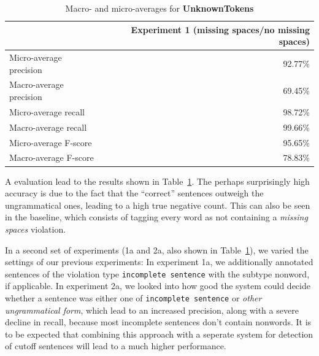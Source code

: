\documentclass[a4paper,10pt]{scrartcl}
\begin{document}
\begin{table}

\begin{center}
\begin{tabular}{l|r}
& Experiment 1 (missing spaces/no missing spaces) \\
\hline
Micro-average precision & 92.77\% \\
\hline
Macro-average precision & 69.45\% \\
\hline
Micro-average recall & 98.72\% \\
\hline
Macro-average recall & 99.66\% \\
\hline
Micro-average F-score & 95.65\% \\
\hline
Macro-average F-score & 78.83\% \\
\end{tabular}
\end{center}
\caption{Macro- and micro-averages for \textbf{UnknownTokens}} %








\label{eval3}
\end{table}


A evaluation lead to the results shown in Table~\ref{eval3}. The perhaps surprisingly high accuracy is due to the fact that the ``correct'' sentences outweigh the ungrammatical ones, leading to a high true negative count. This can also be seen in the baseline, which consists of tagging every word as not containing a \textit{missing spaces} violation.

In a second set of experiments (1a and 2a, also shown in Table~\ref{eval3}), we varied the settings of our previous experiments: In experiment 1a, we additionally annotated sentences of the violation type \texttt{incomplete sentence} with the subtype nonword, if applicable. In experiment 2a, we looked into how good the system could decide whether a sentence was either one of \texttt{incomplete sentence} or \textit{other ungrammatical form}, which lead to an increased precision, along with a severe decline in recall, because most incomplete sentences don't contain nonwords. It is to be expected that combining this approach with a seperate system for detection of cutoff sentences will lead to a much higher performance.
\end{document}
